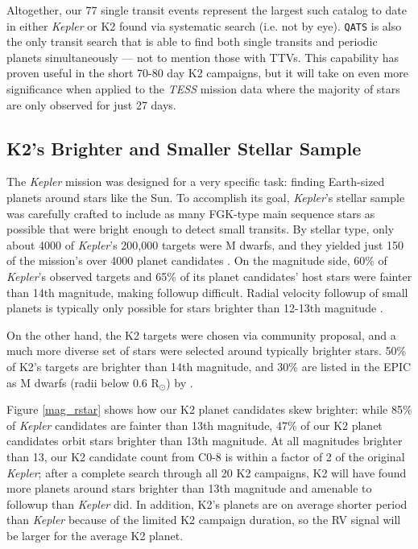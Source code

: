 \documentclass[twocolumn]{aastex62}
\newcommand{\project}[1]{\textsl{#1}}
\newcommand{\pipeline}[1]{\texttt{#1}}
\newcommand{\nsingletran}{77}
\newcommand{\fracbright}{47}
\begin{document}
Altogether, our \nsingletran{} single transit events represent the
largest such catalog to date in either \project{Kepler} or K2 found
via systematic search (i.e. not by eye). \pipeline{QATS} is also the
only transit search that is able to find both single transits and
periodic planets simultaneously --- not to mention those with
TTVs. This capability has proven useful in the short 70-80 day K2
campaigns, but it will take on even more significance when applied to
the \project{TESS} mission data where the majority of stars are only
observed for just 27 days.


\subsection{K2's Brighter and Smaller Stellar Sample}
\label{sec:brighter_smaller}

The \project{Kepler} mission was designed for a very specific task:
finding Earth-sized planets around stars like the Sun. To accomplish
its goal, \project{Kepler}'s stellar sample was carefully crafted to
include as many FGK-type main sequence stars as possible that were
bright enough to detect small transits. By stellar type, only about
4000 of \project{Kepler}'s 200,000 targets were M dwarfs, and they
yielded just 150 of the mission's over 4000 planet candidates
\citep{dre13, dre15}.  On the magnitude side, 60\% of
\project{Kepler}'s observed targets and 65\% of its planet candidates'
host stars were fainter than 14th magnitude, making followup
difficult. Radial velocity followup of small planets is typically only
possible for stars brighter than 12-13th magnitude \citep{mar14}.

On the other hand, the K2 targets were chosen via community proposal,
and a much more diverse set of stars were selected around typically
brighter stars. 50\% of K2's targets are brighter than 14th magnitude,
and 30\% are listed in the EPIC as M dwarfs (radii below 0.6
R$_\odot$) by \cite{hub16}.

Figure \ref{mag_rstar} shows how our K2 planet candidates skew
brighter: while 85\% of \project{Kepler} candidates are fainter than
13th magnitude, \fracbright{}\% of our K2 planet candidates orbit
stars brighter than 13th magnitude. At all magnitudes brighter than
13, our K2 candidate count from C0-8 is within a factor of 2 of the
original \project{Kepler}; after a complete search through all 20 K2
campaigns, K2 will have found more planets around stars brighter than
13th magnitude and amenable to followup than \project{Kepler} did. In
addition, K2's planets are on average shorter period than
\project{Kepler} because of the limited K2 campaign duration, so the
RV signal will be larger for the average K2 planet.
\end{document}
